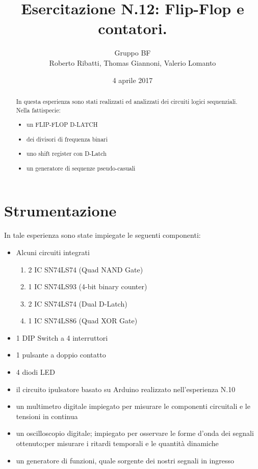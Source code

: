 \documentclass[a4paper,11pt]{article}
\author{Gruppo BF \\ Roberto Ribatti, Thomas Giannoni, Valerio Lomanto}
\title{Esercitazione N.12: Flip-Flop e contatori.}
\date{4 aprile 2017}
\begin{document}
\maketitle
\begin{abstract}
		In questa esperienza sono stati realizzati ed analizzati dei circuiti logici sequenziali.
		Nella fattispecie: \begin{itemize} 
			\item un FLIP-FLOP D-LATCH
			\item dei divisori di frequenza binari 
			\item uno shift register con D-Latch
			\item un generatore di sequenze pseudo-casuali
		\end{itemize}
\end{abstract}
\section{Strumentazione}
	In tale esperienza sono state impiegate le seguenti componenti:\begin{itemize}
		\item Alcuni circuiti integrati \begin{enumerate}
			\item 2 IC SN74LS74 (Quad NAND Gate)
			\item 1 IC SN74LS93 (4-bit binary counter)
			\item 2 IC SN74LS74 (Dual D-Latch)
			\item 1 IC SN74LS86 (Quad XOR Gate)
		\end{enumerate}
		\item 1 DIP Switch a 4 interruttori
		\item 1 pulsante a doppio contatto
		\item 4 diodi LED
		\item il circuito ipulsatore basato su Arduino realizzato nell'esperienza N.10
		\item un multimetro digitale impiegato per misurare le componenti circuitali e le tensioni in continua
		\item un oscilloscopio digitale; impiegato per osservare le forme d'onda dei segnali ottenuto;per misurare i ritardi temporali e le quantità dinamiche
		\item un generatore di funzioni, quale sorgente dei nostri segnali in ingresso
	\end{itemize}
\end{document}
